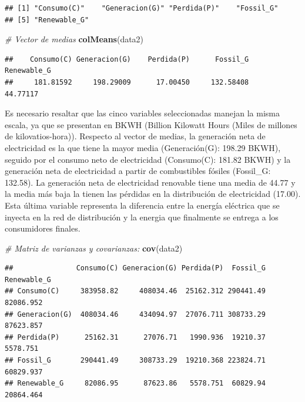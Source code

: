 \documentclass[
]{article}
\newenvironment{Shaded}{\begin{snugshade}}{\end{snugshade}}
\newcommand{\CommentTok}[1]{\textcolor[rgb]{0.56,0.35,0.01}{\textit{#1}}}
\newcommand{\FunctionTok}[1]{\textcolor[rgb]{0.13,0.29,0.53}{\textbf{#1}}}
\newcommand{\NormalTok}[1]{#1}
\begin{document}
\begin{verbatim}
## [1] "Consumo(C)"    "Generacion(G)" "Perdida(P)"    "Fossil_G"     
## [5] "Renewable_G"
\end{verbatim}

\begin{Shaded}
\begin{Highlighting}[]
\CommentTok{\# Vector de medias}
\FunctionTok{colMeans}\NormalTok{(data2)}
\end{Highlighting}
\end{Shaded}

\begin{verbatim}
##    Consumo(C) Generacion(G)    Perdida(P)      Fossil_G   Renewable_G 
##     181.81592     198.29009      17.00450     132.58408      44.77117
\end{verbatim}

Es necesario resaltar que las cinco variables seleccionadas manejan la
misma escala, ya que se presentan en BKWH (Billion Kilowatt Hours (Miles
de millones de kilovatios-hora)). Respecto al vector de medias, la
generación neta de electricidad es la que tiene la mayor media
(Generación(G): 198.29 BKWH), seguido por el consumo neto de
electricidad (Consumo(C): 181.82 BKWH) y la generación neta de
electricidad a partir de combustibles fósiles (Fossil\_G: 132.58). La
generación neta de electricidad renovable tiene una media de 44.77 y la
media más baja la tienen las pérdidas en la distribución de electricidad
(17.00). Esta última variable representa la diferencia entre la energía
eléctrica que se inyecta en la red de distribución y la energia que
finalmente se entrega a los consumidores finales.

\begin{Shaded}
\begin{Highlighting}[]
\CommentTok{\# Matriz de varianzas y covarianzas:}
\FunctionTok{cov}\NormalTok{(data2)}
\end{Highlighting}
\end{Shaded}

\begin{verbatim}
##               Consumo(C) Generacion(G) Perdida(P)  Fossil_G Renewable_G
## Consumo(C)     383958.82     408034.46  25162.312 290441.49   82086.952
## Generacion(G)  408034.46     434094.97  27076.711 308733.29   87623.857
## Perdida(P)      25162.31      27076.71   1990.936  19210.37    5578.751
## Fossil_G       290441.49     308733.29  19210.368 223824.71   60829.937
## Renewable_G     82086.95      87623.86   5578.751  60829.94   20864.464
\end{verbatim}
\end{document}
